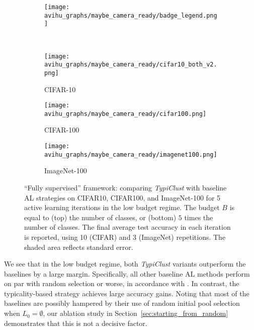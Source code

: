 \documentclass{article}
\begin{document}
\begin{figure}[hbt]
\begin{center}
\vspace{-.05cm}
\begin{subfigure}{.45\textwidth}
  \centering
 \texttt{[image: avihu\_graphs/maybe\_camera\_ready/badge\_legend.png]}
\end{subfigure}
\\
    \begin{subfigure}{.157\textwidth}
      \centering
      \texttt{[image: avihu\_graphs/maybe\_camera\_ready/cifar10\_both\_v2.png]}
\caption{CIFAR-10}
    \label{fig:main_al_graph_cifar10}
    \end{subfigure}
    \begin{subfigure}{.157\textwidth}
      \centering
      \texttt{[image: avihu\_graphs/maybe\_camera\_ready/cifar100.png]}
\caption{CIFAR-100}
    \label{fig:main_al_graph_cifar100}
    \end{subfigure}
    \begin{subfigure}{.157\textwidth}
      \centering
      \texttt{[image: avihu\_graphs/maybe\_camera\_ready/imagenet100.png]}
\caption{ImageNet-100}
    \label{fig:main_al_graph_tinyimagenet}
    \end{subfigure}
\vspace{-0.35cm}
\caption{``Fully supervised'' framework: comparing \emph{TypiClust} with baseline AL strategies on CIFAR10, CIFAR100, and ImageNet-100 for 5 active learning iterations in the low budget regime. The budget $B$ is equal to (top) the number of classes, or (bottom) $5$ times the number of classes. The final average test accuracy in each iteration is reported, using 10 (CIFAR) and 3 (ImageNet) repetitions. The shaded area reflects standard error.}
\label{fig:main_al_graph}
\end{center}
\vspace{-.25cm}
\end{figure}



We see that in the low budget regime, both \emph{TypiClust} variants outperform the baselines by a large margin. Specifically, all other baseline AL methods perform on par with random selection or worse, in accordance with \citet{pourahmadi2021simple}. In contrast, the typicality-based strategy achieves large accuracy gains.
Noting that most of the baselines are possibly hampered by their use of random initial pool selection when $L_0=\emptyset$, our ablation study in Section~\ref{sec:starting_from_random} demonstrates that this is not a decisive factor.
\end{document}
